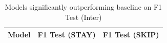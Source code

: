 \begin{table}[ht]
\centering
\begin{tabular}{lcc}
\hline
Model & F1 Test (STAY) & F1 Test (SKIP) \\
\hline
\hline
\end{tabular}
\caption{Models significantly outperforming baseline on F1 Test (Inter)}
\label{tab:sig_f1_inter_ablation}
\end{table}

\vspace{1em}